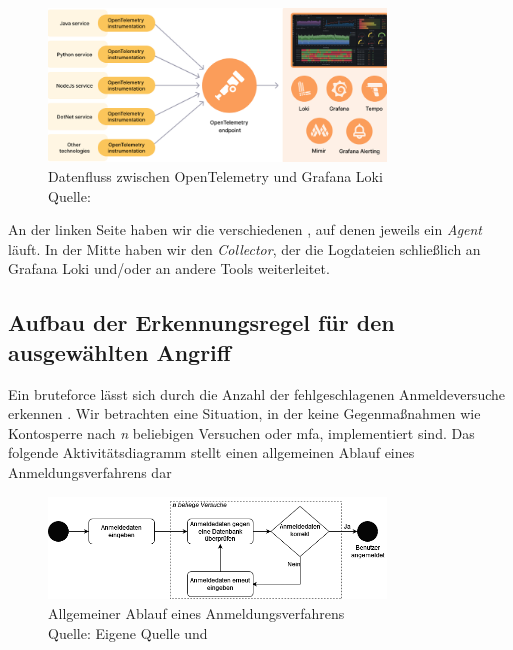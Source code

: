 \begin{figure}[H]
   \centering
   \includegraphics[width=0.8\textwidth]{assets/Grafana_OpenTelemtry.png}
   \caption[Datenfluss zwischen OpenTelemetry und Grafana Loki]
   {Datenfluss zwischen OpenTelemetry und Grafana Loki\\Quelle: \citep{Grafana_WhatOpentelemetry}}
   \centering
\end{figure}

An der linken Seite haben wir die verschiedenen , auf denen jeweils ein \textit{Agent} läuft. In der Mitte haben wir den \textit{Collector}, der die Logdateien schließlich an Grafana Loki und/oder an andere Tools weiterleitet.

\newpage
\subsection{Aufbau der Erkennungsregel für den ausgewählten Angriff}
Ein \gls{bruteforce} lässt sich durch die Anzahl der fehlgeschlagenen Anmeldeversuche erkennen \citep{Selvaganesh_SplunkBruteForce}. Wir betrachten eine Situation, in der keine Gegenmaßnahmen wie Kontosperre nach \textit{n} beliebigen Versuchen oder \gls{mfa}, implementiert sind. Das folgende Aktivitätsdiagramm stellt einen allgemeinen Ablauf eines Anmeldungsverfahrens dar

\begin{figure}[H]
   \centering
   \includegraphics[width=0.8\textwidth]{assets/Anmeldeverfahren.drawio.png}
   \caption[Allgemeiner Ablauf eines Anmeldungsverfahrens]
   {Allgemeiner Ablauf eines Anmeldungsverfahrens \\Quelle: Eigene Quelle und \citep{Selvaganesh_SplunkBruteForce}}
   \centering
\end{figure}

